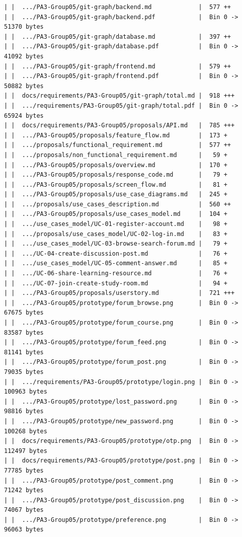 \documentclass[12pt]{article}
\begin{document}
\begin{lstlisting}[numbers=none,breaklines=true]
| |  .../PA3-Group05/git-graph/backend.md             |  577 ++
| |  .../PA3-Group05/git-graph/backend.pdf            |  Bin 0 -> 51370 bytes
| |  .../PA3-Group05/git-graph/database.md            |  397 ++
| |  .../PA3-Group05/git-graph/database.pdf           |  Bin 0 -> 41092 bytes
| |  .../PA3-Group05/git-graph/frontend.md            |  579 ++
| |  .../PA3-Group05/git-graph/frontend.pdf           |  Bin 0 -> 50882 bytes
| |  docs/requirements/PA3-Group05/git-graph/total.md |  918 +++
| |  .../requirements/PA3-Group05/git-graph/total.pdf |  Bin 0 -> 65924 bytes
| |  docs/requirements/PA3-Group05/proposals/API.md   |  785 +++
| |  .../PA3-Group05/proposals/feature_flow.md        |  173 +
| |  .../proposals/functional_requirement.md          |  577 ++
| |  .../proposals/non_functional_requirement.md      |   59 +
| |  .../PA3-Group05/proposals/overview.md            |  170 +
| |  .../PA3-Group05/proposals/response_code.md       |   79 +
| |  .../PA3-Group05/proposals/screen_flow.md         |   81 +
| |  .../PA3-Group05/proposals/use_case_diagrams.md   |  245 +
| |  .../proposals/use_cases_description.md           |  560 ++
| |  .../PA3-Group05/proposals/use_cases_model.md     |  104 +
| |  .../use_cases_model/UC-01-register-account.md    |   98 +
| |  .../proposals/use_cases_model/UC-02-log-in.md    |   83 +
| |  .../use_cases_model/UC-03-browse-search-forum.md |   79 +
| |  .../UC-04-create-discussion-post.md              |   76 +
| |  .../use_cases_model/UC-05-comment-answer.md      |   85 +
| |  .../UC-06-share-learning-resource.md             |   76 +
| |  .../UC-07-join-create-study-room.md              |   94 +
| |  .../PA3-Group05/proposals/userstory.md           |  721 +++
| |  .../PA3-Group05/prototype/forum_browse.png       |  Bin 0 -> 67675 bytes
| |  .../PA3-Group05/prototype/forum_course.png       |  Bin 0 -> 83587 bytes
| |  .../PA3-Group05/prototype/forum_feed.png         |  Bin 0 -> 81141 bytes
| |  .../PA3-Group05/prototype/forum_post.png         |  Bin 0 -> 79035 bytes
| |  .../requirements/PA3-Group05/prototype/login.png |  Bin 0 -> 100963 bytes
| |  .../PA3-Group05/prototype/lost_password.png      |  Bin 0 -> 98816 bytes
| |  .../PA3-Group05/prototype/new_password.png       |  Bin 0 -> 100268 bytes
| |  docs/requirements/PA3-Group05/prototype/otp.png  |  Bin 0 -> 112497 bytes
| |  docs/requirements/PA3-Group05/prototype/post.png |  Bin 0 -> 77785 bytes
| |  .../PA3-Group05/prototype/post_comment.png       |  Bin 0 -> 71242 bytes
| |  .../PA3-Group05/prototype/post_discussion.png    |  Bin 0 -> 74067 bytes
| |  .../PA3-Group05/prototype/preference.png         |  Bin 0 -> 96063 bytes

\end{lstlisting}
\end{document}
